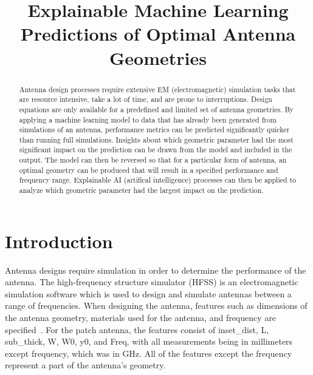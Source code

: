 \documentclass[conference]{IEEEtran}
\begin{document}
\title{Explainable Machine Learning Predictions of Optimal Antenna Geometries}

\author{
}

\maketitle

\begin{abstract}
Antenna design processes require extensive EM (electromagnetic) simulation tasks that are resource intensive, take a lot of time, and are prone to interruptions. Design equations are only available for a predefined and limited set of antenna geometries. By applying a machine learning model to data that has already been generated from simulations of an antenna, performance metrics can be predicted significantly quicker than running full simulations. Insights about which geometric parameter had the most significant impact on the prediction can be drawn from the model and included in the output. The model can then be reversed so that for a particular form of antenna, an optimal geometry can be produced that will result in a specified performance and frequency range. Explainable AI (artifical intelligence) processes can then be applied to analyze which geometric parameter had the largest impact on the prediction.
\end{abstract}

\section{Introduction}
Antenna designs require simulation in order to determine the performance of the antenna. The high-frequency structure simulator (HFSS) is an electromagnetic simulation software which is used to design and simulate antennas between a range of frequencies. When designing the antenna, features such as dimensions of the antenna geometry, materials used for the antenna, and frequency are specified~\cite{Maxworth_2022}. For the patch antenna, the features consist of inset\_dist, L, sub\_thick, W, W0, y0, and Freq, with all measurements being in millimeters except frequency, which was in GHz. All of the features except the frequency represent a part of the antenna's geometry.
\end{document}

